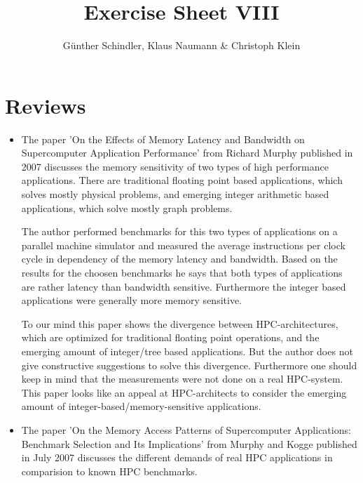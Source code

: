 \documentclass[oneside, a4paper, DIV=10]{scrartcl}
\title{Exercise Sheet VIII}
\author{G\"unther Schindler, Klaus Naumann \& Christoph Klein}
\begin{document}
\maketitle

\section*{Reviews}
\begin{itemize}
    \item
    The paper 'On the Effects of Memory Latency and Bandwidth on
    Supercomputer Application Performance' from Richard Murphy
    published in 2007 discusses the memory sensitivity of two types
    of high performance applications. There are traditional floating
    point based applications, which solves mostly physical problems,
    and emerging integer arithmetic based applications, which solve mostly
    graph problems.

    The author performed benchmarks for this two types of applications
    on a parallel machine simulator and measured the average instructions
    per clock cycle in dependency of the memory latency and bandwidth. Based
    on the results for the choosen benchmarks he says that both types of
    applications are rather latency than bandwidth sensitive. Furthermore
    the integer based applications were generally more memory 
    sensitive.

    To our mind this paper shows the divergence between HPC-architectures,
    which are optimized for traditional floating point operations, and the
    emerging amount of integer/tree based applications. But the author
    does not give constructive suggestions to solve this divergence. Furthermore
    one should keep in mind that the measurements were not done on a real HPC-system.
    This paper looks like an appeal at HPC-architects to consider the emerging
    amount of integer-based/memory-sensitive applications.

    \item
    The paper 'On the Memory Access Patterns of Supercomputer Applications:
    Benchmark Selection and Its Implications' from Murphy and Kogge published
    in July 2007 discusses the different demands of real HPC applications in 
    comparision to known HPC benchmarks.


\end{itemize}
\end{document}
